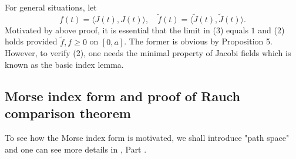 \documentclass{ctexart}
\begin{document}
For general situations, let 
$$
f(t)=\langle J(t),J(t)\rangle,\quad \widetilde{f}(t)=\langle \widetilde{J}(t),\widetilde{J}(t)\rangle.
$$
Motivated by above proof, it is essential that the limit in (3) equals $1$ and (2) holds provided $\tilde{f},f \geq 0$ on $[0,a]$. 
The former is obvious by Proposition 5. However, to verify (2), one needs the minimal property of Jacobi fields which is known as the basic index lemma.



\subsection*{Morse index form and proof of Rauch comparison theorem}

To see how the Morse index form is motivated, we shall introduce "path space" and one can see more details in \cite{Milnor1973}, Part \uppercase\expandafter{}. 
\end{document}
